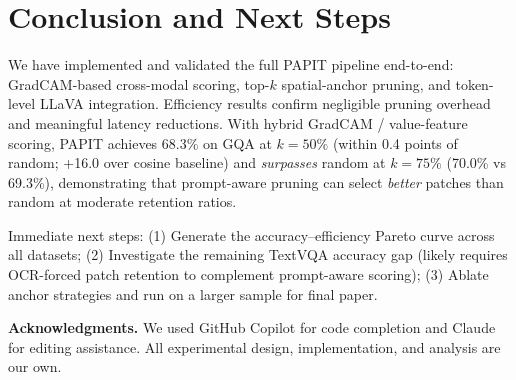 \documentclass[10pt,twocolumn,letterpaper]{article}
\begin{document}
\section{Conclusion and Next Steps}

We have implemented and validated the full PAPIT pipeline end-to-end:
GradCAM-based cross-modal scoring, top-$k$ spatial-anchor pruning, and
token-level LLaVA integration.
Efficiency results confirm negligible pruning overhead and meaningful
latency reductions.
With hybrid GradCAM / value-feature scoring, PAPIT achieves 68.3\% on
GQA at $k{=}50\%$ (within 0.4 points of random; +16.0 over cosine
baseline) and \emph{surpasses} random at $k{=}75\%$ (70.0\% vs 69.3\%),
demonstrating that prompt-aware pruning can select \emph{better} patches
than random at moderate retention ratios.

Immediate next steps:
(1) Generate the accuracy--efficiency Pareto curve across all datasets;
(2) Investigate the remaining TextVQA accuracy gap (likely requires
    OCR-forced patch retention to complement prompt-aware scoring);
(3) Ablate anchor strategies and run on a larger sample for final paper.

\noindent\textbf{Acknowledgments.}
We used GitHub Copilot for code completion and Claude for editing assistance.
All experimental design, implementation, and analysis are our own.

{\small


}
\end{document}
